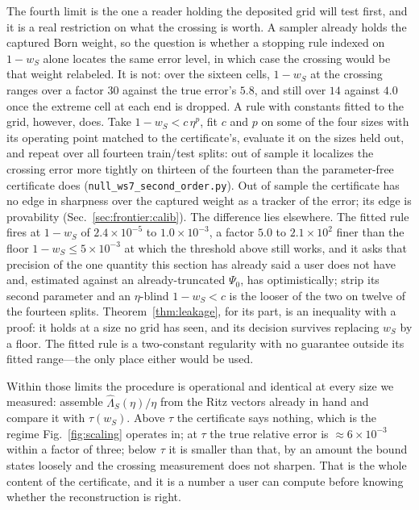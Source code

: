 The fourth limit is the one a reader holding the deposited grid will test first, and it is a real
restriction on what the crossing is worth. A sampler already holds the captured Born weight, so the
question is whether a stopping rule indexed on $1-w_S$ alone locates the same error level, in which
case the crossing would be that weight relabeled. It is not: over the sixteen cells, $1-w_S$ at the
crossing ranges over a factor $30$ against the true error's $5.8$, and still over $14$ against $4.0$
once the extreme cell at each end is dropped. A rule with constants fitted to the grid, however,
does. Take $1-w_S<c\,\eta^{p}$, fit $c$ and $p$ on some of the four sizes
with its operating point matched to the certificate's, evaluate it on the sizes held out, and repeat
over all fourteen train/test splits: out of sample it localizes the crossing error more tightly on thirteen
of the fourteen than the parameter-free certificate does (\texttt{null\_ws7\_\allowbreak second\_order.py}).
Out of sample the certificate has no edge in sharpness over the captured weight as a tracker of the
error; its edge is provability (Sec.~\ref{sec:frontier:calib}). The difference lies elsewhere. The fitted rule fires at $1-w_S$ of $2.4\times10^{-5}$ to $1.0\times10^{-3}$, a factor $5.0$ to $2.1\times10^{2}$ finer than the floor
$1-w_S\le5\times10^{-3}$ at which the threshold above still works, and it asks that precision of the one
quantity this section has already said a user does not have and, estimated against an already-truncated
$\Psi_0$, has optimistically; strip its second parameter and an $\eta$-blind $1-w_S<c$ is the looser of the two on twelve of the fourteen splits. Theorem~\ref{thm:leakage}, for its part, is an inequality with a proof:
it holds at a size no grid has seen, and its decision survives replacing $w_S$ by a floor. The fitted
rule is a two-constant regularity with no guarantee outside its fitted range---the only place either
would be used.

Within those limits the procedure is operational and identical at every size we measured: assemble
$\widehat\Lambda_S(\eta)/\eta$ from the Ritz vectors already in hand and compare it with $\tau(w_S)$.
Above $\tau$ the certificate says nothing, which is the regime Fig.~\ref{fig:scaling} operates in; at
$\tau$ the true relative error is ${\approx}6\times10^{-3}$ within a factor of three; below $\tau$ it
is smaller than that, by an amount the bound states loosely and the crossing measurement does not sharpen. That
is the whole content of the certificate, and it is a number a user can compute before knowing whether
the reconstruction is right.

